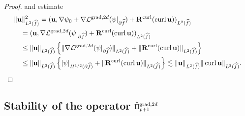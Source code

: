 \documentclass{article}
\newcommand{\hatPigradcomtwod}{\widehat\Pi^{\operatorname*{grad},2d}_{p+1}}
\begin{document}
\begin{proof}
and estimate
\begin{align*}
& \Vert{\mathbf{u}}\Vert_{L^{2}(\widehat{f})}^{2}    =({\mathbf{u}},\nabla\psi_{0}%
+\nabla{\mathcal{L}^{\operatorname{grad},2d}}(\psi|_{\partial \widehat{f}})+{\mathbf{R}}^{\operatorname*{curl}%
}(\operatorname{curl}{\mathbf{u}}))_{L^{2}(\widehat{f})} \\
& \quad =({\mathbf{u}}%
,\nabla{\mathcal{L}^{\operatorname{grad},2d}}(\psi|_{\partial \widehat{f}})+{\mathbf{R}}^{\operatorname*{curl}%
}(\operatorname{curl}{\mathbf{u}}))_{L^{2}(\widehat{f})}\\
&  \quad \leq\Vert{\mathbf{u}}\Vert_{L^{2}(\widehat{f})}\left\{  \Vert\nabla{\mathcal{L}^{\operatorname{grad},2d}}%
(\psi|_{\partial \widehat{f}})\Vert_{L^{2}(\widehat{f})}+\Vert{\mathbf{R}}^{\operatorname*{curl}%
}(\operatorname{curl}{\mathbf{u}})\Vert_{L^{2}(\widehat{f})}\right\} \\
&  \quad \leq\Vert{\mathbf{u}}\Vert_{L^{2}(\widehat{f})}\left\{  |\psi|_{H^{1/2}%
(\partial \widehat{f})}+\Vert{\mathbf{R}}^{\operatorname*{curl}}(\operatorname{curl}{\mathbf{u}})\Vert_{L^{2}(\widehat{f})}\right\}  \lesssim\Vert{\mathbf{u}}%
\Vert_{L^{2}(\widehat{f})}\Vert\operatorname{curl}{\mathbf{u}}\Vert_{L^{2}(\widehat{f})}.
\qedhere
\end{align*}
\end{proof}
\subsection{Stability of the operator $\protect\hatPigradcomtwod$}
\end{document}
